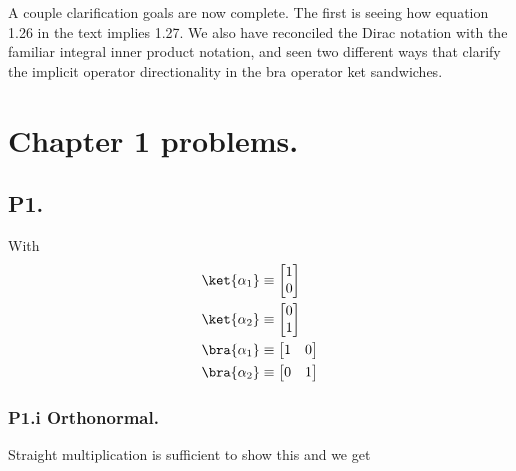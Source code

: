 A couple clarification goals are now complete.  The first is seeing how equation 1.26 in the text implies 1.27.  We also have reconciled the Dirac notation with the familiar integral inner product notation, and seen two different ways that clarify the implicit operator directionality in the bra operator ket sandwiches.

\section{Chapter 1 problems.}

\subsection{P1.}

With
\begin{align*}
\ket{\alpha_1} &\equiv 
\begin{bmatrix}
1 \\
0
\end{bmatrix} \\
\ket{\alpha_2} &\equiv 
\begin{bmatrix}
0 \\
1
\end{bmatrix} \\
\bra{\alpha_1} &\equiv 
\begin{bmatrix}
1 & 0
\end{bmatrix} \\
\bra{\alpha_2} &\equiv 
\begin{bmatrix}
0 & 1
\end{bmatrix}
\end{align*}

\subsubsection{P1.i Orthonormal.}

Straight multiplication is sufficient to show this and we get

